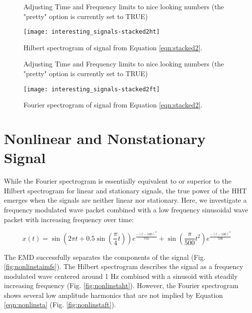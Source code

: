 \documentclass[12pt]{article}
\begin{document}
\begin{figure}[ht]
\begin{center}
\begin{Schunk}
\begin{Soutput}
Adjusting Time and Frequency limits to nice looking numbers (the "pretty" option is currently set to TRUE)
\end{Soutput}
\end{Schunk}
\texttt{[image: interesting\_signals-stacked2ht]}
\end{center}
\caption{Hilbert spectrogram of signal from Equation \ref{eqn:stacked2}.}
\label{fig:stacked2ht}
\end{figure}

\begin{figure}[ht]
\begin{center}
\begin{Schunk}
\begin{Soutput}
Adjusting Time and Frequency limits to nice looking numbers (the "pretty" option is currently set to TRUE)
\end{Soutput}
\end{Schunk}
\texttt{[image: interesting\_signals-stacked2ft]}
\end{center}
\caption{Fourier spectrogram of signal from Equation \ref{eqn:stacked2}.}
\label{fig:stacked2ft}
\end{figure}

\FloatBarrier

\section{Nonlinear and Nonstationary Signal}
While the Fourier spectrogram is essentially equivalent to or superior to the Hilbert spectrogram for linear and stationary signals,
the true power of the HHT emerges when the signals are neither linear nor stationary.
Here, we investigate a frequency modulated wave packet combined with a low frequency sinusoidal wave packet with increasing frequency over time:

\begin{equation}
\label{eqn:nonlinsta}
x (t) = \sin(2\pi t+0.5\sin(\frac{\pi}{4} t))e^{\frac{-(t-100)^{2}}{750}} + \sin(\frac{\pi}{500} t^{2})e^{\frac{-(t-100)^{2}}{500}}
\end{equation}

The EMD successfully separates the components of the signal (Fig. \ref{fig:nonlinstaimfs}).
The Hilbert spectrogram describes the signal as a frequency modulated wave centered around 1 Hz combined with a 
sinusoid with steadily increasing frequency (Fig. \ref{fig:nonlinstaht}).
However, the Fourier spectrogram shows several low amplitude harmonics that are not implied by Equation \ref{eqn:nonlinsta} (Fig. \ref{fig:nonlinstaft}).
\end{document}
